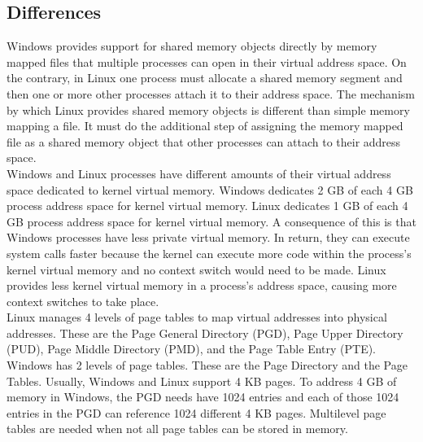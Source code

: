 \documentclass[letterpaper,10pt,titlepage]{article}
\begin{document}
\subsection{Differences}
Windows provides support for shared memory objects directly by memory 
mapped files that multiple processes can open in their virtual address space.
On the contrary, in Linux one process must allocate a shared memory segment and
then one or more other processes attach it to their address space. The 
mechanism by which Linux provides shared memory objects is different than 
simple memory mapping a file. It must do the additional step of assigning the
memory mapped file as a shared memory object that other processes can attach
to their address space.
\\
\linebreak
Windows and Linux processes have different amounts of their virtual address
space dedicated to kernel virtual memory. Windows dedicates 2 GB of each 4 GB
process address space for kernel virtual memory. Linux dedicates 1 GB of each
4 GB process address space for kernel virtual memory. A consequence of this 
is that Windows processes have less private virtual memory. In return, they 
can execute system calls faster because the kernel can execute more code 
within the process's kernel virtual memory and no context switch would need to
be made. Linux provides less kernel virtual memory in a process's address 
space, causing more context switches to take place. 
\\ 
\linebreak
Linux manages 4 levels of page tables to map virtual addresses into physical
addresses. These are the Page General Directory (PGD), Page Upper Directory
(PUD), Page Middle Directory (PMD), and the Page Table Entry (PTE). Windows
has 2 levels of page tables. These are the Page Directory and the Page Tables.
Usually, Windows and Linux support 4 KB pages. To address 4 GB of memory in
Windows, the PGD needs have 1024 entries and each of those 1024 entries in
the PGD can reference 1024 different 4 KB pages. Multilevel page tables
are needed when not all page tables can be stored in memory.
\end{document}
